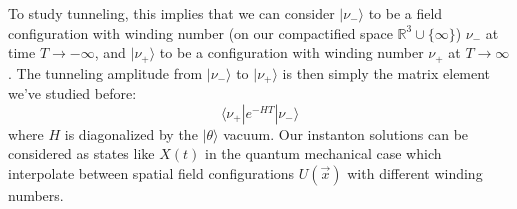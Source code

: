 \documentclass[11pt, oneside]{article}   	%
\theoremstyle{definition}
\begin{document}
To study tunneling, this implies that we can consider $|\nu_-\rangle$ to be a field configuration with winding number (on our compactified 
space $\mathbb R^3\cup\{\infty\}$) $\nu_-$ at time $T\rightarrow -\infty$, and $|\nu_+\rangle$ to be a configuration with winding number 
$\nu_+$ at $T\rightarrow\infty$. The tunneling amplitude from $|\nu_-\rangle$ to $|\nu_+\rangle$ is then simply the matrix element 
we've studied before:
\begin{equation}
	\langle\nu_+ | e^{-HT} | \nu_-\rangle
\end{equation}
where $H$ is diagonalized by the $|\theta\rangle$ vacuum. Our instanton solutions can be considered as states like $X(t)$ in the 
quantum mechanical case which interpolate between spatial field configurations $U(\vec x)$ with different winding numbers. 
\end{document}
